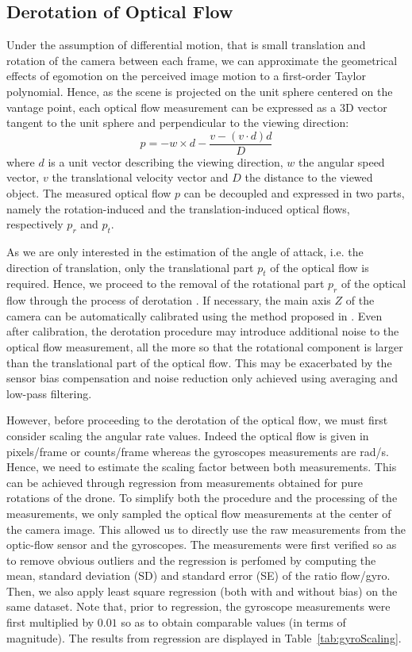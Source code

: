 \subsection{Derotation of Optical Flow}
Under the assumption of differential motion, that is small translation and rotation of the camera between each frame, we can approximate the geometrical effects of egomotion on the perceived image motion to a first-order Taylor polynomial. Hence, as the scene is projected on the unit sphere centered on the vantage point, each optical flow measurement can be expressed as a 3D vector tangent to the unit sphere and perpendicular to the viewing direction:
\begin{equation}
\label{equ:opticflow}
p = -w \times d - \dfrac{v - (v \cdot d)d}{D}
\end{equation}
where $d$ is a unit vector describing the viewing direction, $w$ the angular speed vector, $v$ the translational velocity vector and $D$ the distance to the viewed object. The measured optical flow $p$ can be decoupled and expressed in two parts, namely the rotation-induced and the translation-induced optical flows, respectively $p_r$ and $p_t$.

As we are only interested in the estimation of the angle of attack, i.e. the direction of translation, only the translational part $p_t$ of the optical flow is required. Hence, we proceed to the removal of the rotational part $p_r$ of the optical flow through the process of derotation \cite{derotation}. If necessary, the main axis $Z$ of the camera can be automatically calibrated using the method proposed in \cite{autocalib}. Even after calibration, the derotation procedure may introduce additional noise to the optical flow measurement, all the more so that the rotational component is larger than the translational part of the optical flow. This may be exacerbated by the sensor bias compensation and noise reduction only achieved using averaging and low-pass filtering.

However, before proceeding to the derotation of the optical flow, we must first consider scaling the angular rate values. Indeed the optical flow is given in pixels/frame or counts/frame whereas the gyroscopes measurements are rad/s. Hence, we need to estimate the scaling factor between both measurements. This can be achieved through regression from measurements obtained for pure rotations of the drone. To simplify both the procedure and the processing of the measurements, we only sampled the optical flow measurements at the center of the camera image. This allowed us to directly use the raw measurements from the optic-flow sensor and the gyroscopes. The measurements were first verified so as to remove obvious outliers and the regression is perfomed by computing the mean, standard deviation (SD) and standard error (SE) of the ratio flow/gyro. Then, we also apply least square regression (both with and without bias) on the same dataset. Note that, prior to regression, the gyroscope measurements were first multiplied by $0.01$ so as to obtain comparable values (in terms of magnitude). The results from regression are displayed in Table~\ref{tab:gyroScaling}.

